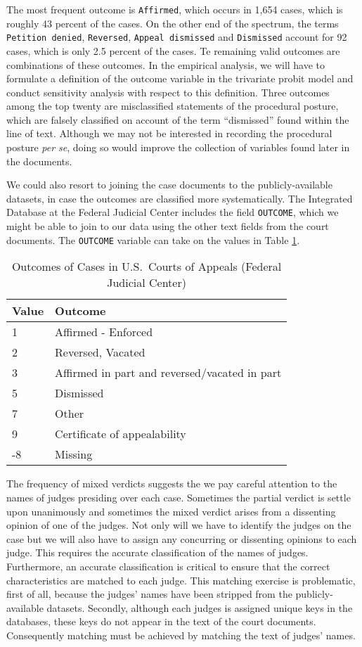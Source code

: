 \documentclass[11pt]{paper}
\begin{document}
% 
The most frequent outcome is \texttt{Affirmed}, which occurs in 1,654 cases, 
which is roughly 43 percent of the cases. 
On the other end of the spectrum, 
the terms \texttt{Petition denied},  \texttt{Reversed},  
\texttt{Appeal dismissed} and  \texttt{Dismissed}
account for 92 cases, which is only 2.5 percent of the cases. 
Te remaining valid outcomes are combinations of these outcomes. 
In the empirical analysis, we will have to formulate a definition of the outcome
variable in the trivariate probit model 
and conduct sensitivity analysis with respect to this definition.
Three outcomes among the top twenty are misclassified statements of the procedural posture, 
which are falsely classified on account of the term ``dismissed'' found within the line of text.
Although we may not be interested in recording the procedural posture {\it per se}, 
doing so would improve the collection of variables found later in the documents. 

We could also resort to joining the case documents to the publicly-available
datasets, in case the outcomes are classified more systematically. 
The Integrated Database at the Federal Judicial Center
includes the field \texttt{OUTCOME}, which we might be able to
join to our data using the other text fields from the court documents.  
% 
The \texttt{OUTCOME} variable can take on the values
in Table \ref{tab:outcome_list_FJC}.
% 
\begin{table}[ht]
\centering
\begin{tabular}{l l}
  \hline
	Value 		& Outcome \\ 
  \hline
	1 				& Affirmed - Enforced \\
	2 				& Reversed, Vacated \\
	3 				& Affirmed in part and reversed/vacated in part \\
	5 				& Dismissed \\
	7 				& Other  \\
	9 				& Certificate of appealability \\
	-8 			& Missing \\
   \hline
\end{tabular}
\caption{Outcomes of Cases in U.S.~Courts of Appeals (Federal Judicial Center)} 
\label{tab:outcome_list_FJC}
\end{table}
% 

The frequency of mixed verdicts suggests the we pay careful attention 
to the names of judges presiding over each case.
Sometimes the partial verdict is settle upon unanimously and sometimes
the mixed verdict arises from a dissenting opinion of one of the judges. 
Not only will we have to identify the judges on the case
but we will also have to assign any concurring or dissenting opinions
to each judge. 
This requires the accurate classification of the names of judges.
Furthermore, an accurate classification is critical to ensure that the correct 
characteristics are matched to each judge. 
This matching exercise is problematic, first of all, because the judges' names 
have been stripped from the publicly-available datasets. 
Secondly, although each judges is assigned unique keys in the databases, 
these keys do not appear in the text of the court documents. 
Consequently matching must be achieved by matching the text of judges' names. 
\end{document}
